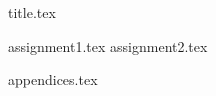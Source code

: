 \documentclass[final]{scrartcl} %
\begin{document}

{title.tex}

\newpage

\tableofcontents

\newpage
{}
{assignment1.tex}
{assignment2.tex}
\newpage
{}

\printbibliography
{appendices.tex}
\end{document}
